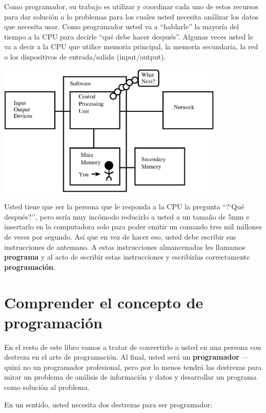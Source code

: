 Como programador, su trabajo es utilizar y coordinar cada uno de estos recursos para dar soluci\'on a lo problemas para los cuales usted necesita an\'alizar los datos que necesita usar. Como programador usted va a ``hablarle'' la mayor\'ia del tiempo a la CPU para decirle ``qu\'e debe hacer despu\'es''. Algunas veces usted le va a decir a la CPU que utilice memoria principal, la memoria secundaria, la red o los dispositivos de entrada/salida (input/output).

\beforefig
\centerline{\includegraphics[height=2.50in]{figs2/arch2.eps}}
\afterfig

Usted tiene que ser la persona que le responda a la CPU la pregunta ``?`Qu\'e despu\'es?'', pero ser\'ia muy inc\'omodo reducirlo a usted a un tama\~no de 5mm e insertarlo en la computadora solo para poder emitir un comando tres mil millones de veces por segundo. As\'i que en vez de hacer eso, usted debe escribir sus instrucciones de antemano.
A estas instrucciones almancenadas les llamamos {\bf programa} y al acto de escribir estas instrucciones y escribirlas correctamente {\bf programaci\'on}.

\section{Comprender el concepto de programaci\'on}

En el resto de este libro vamos a tratar de convertirlo a usted en una persona
con destreza en el arte de programaci\'on. Al final, usted ser\'a un 
{\bf programador} --- quiz\'a no un programador profesional, pero por lo menos tendr\'a las destrezas para mirar un problema de an\'alisis de informaci\'on y datos y desarrollar un programa como soluci\'on al problema.


En un sentido, usted necesita dos destrezas para ser programador:


